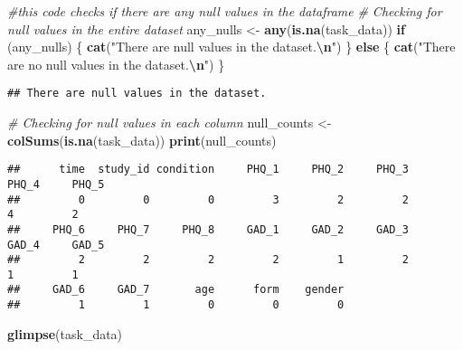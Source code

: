 \documentclass[
]{article}
\newenvironment{Shaded}{\begin{snugshade}}{\end{snugshade}}
\newcommand{\CommentTok}[1]{\textcolor[rgb]{0.56,0.35,0.01}{\textit{#1}}}
\newcommand{\ControlFlowTok}[1]{\textcolor[rgb]{0.13,0.29,0.53}{\textbf{#1}}}
\newcommand{\FunctionTok}[1]{\textcolor[rgb]{0.13,0.29,0.53}{\textbf{#1}}}
\newcommand{\NormalTok}[1]{#1}
\newcommand{\OtherTok}[1]{\textcolor[rgb]{0.56,0.35,0.01}{#1}}
\newcommand{\SpecialCharTok}[1]{\textcolor[rgb]{0.81,0.36,0.00}{\textbf{#1}}}
\newcommand{\StringTok}[1]{\textcolor[rgb]{0.31,0.60,0.02}{#1}}
\begin{document}
\begin{Shaded}
\begin{Highlighting}[]
\CommentTok{\#this code checks if there are any null values in the dataframe}
\CommentTok{\# Checking for null values in the entire dataset}
\NormalTok{any\_nulls }\OtherTok{\textless{}{-}} \FunctionTok{any}\NormalTok{(}\FunctionTok{is.na}\NormalTok{(task\_data))}
\ControlFlowTok{if}\NormalTok{ (any\_nulls) \{}
  \FunctionTok{cat}\NormalTok{(}\StringTok{"There are null values in the dataset.}\SpecialCharTok{\textbackslash{}n}\StringTok{"}\NormalTok{)}
\NormalTok{\} }\ControlFlowTok{else}\NormalTok{ \{}
  \FunctionTok{cat}\NormalTok{(}\StringTok{"There are no null values in the dataset.}\SpecialCharTok{\textbackslash{}n}\StringTok{"}\NormalTok{)}
\NormalTok{\}}
\end{Highlighting}
\end{Shaded}

\begin{verbatim}
## There are null values in the dataset.
\end{verbatim}

\begin{Shaded}
\begin{Highlighting}[]
\CommentTok{\# Checking for null values in each column}
\NormalTok{null\_counts }\OtherTok{\textless{}{-}} \FunctionTok{colSums}\NormalTok{(}\FunctionTok{is.na}\NormalTok{(task\_data))}
\FunctionTok{print}\NormalTok{(null\_counts)}
\end{Highlighting}
\end{Shaded}

\begin{verbatim}
##      time  study_id condition     PHQ_1     PHQ_2     PHQ_3     PHQ_4     PHQ_5 
##         0         0         0         3         2         2         4         2 
##     PHQ_6     PHQ_7     PHQ_8     GAD_1     GAD_2     GAD_3     GAD_4     GAD_5 
##         2         2         2         2         1         2         1         1 
##     GAD_6     GAD_7       age      form    gender 
##         1         1         0         0         0
\end{verbatim}

\begin{Shaded}
\begin{Highlighting}[]
\FunctionTok{glimpse}\NormalTok{(task\_data)}
\end{Highlighting}
\end{Shaded}
\end{document}
